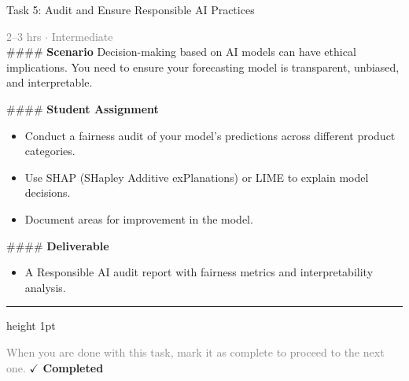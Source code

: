 \documentclass[10pt,a4paper]{article}
\begin{document}
\begin{taskbox}{Task 5: Audit and Ensure Responsible AI Practices}

    {\small \textcolor{gray}{2--3 hrs $\cdot$ Intermediate}}\\[12pt]

    \#\#\#\# \textbf{Scenario}  
Decision-making based on AI models can have ethical implications. You need to ensure your forecasting model is transparent, unbiased, and interpretable.

\#\#\#\# \textbf{Student Assignment}  
\begin{itemize}
    \item Conduct a fairness audit of your model’s predictions across different product categories.  
    \item Use SHAP (SHapley Additive exPlanations) or LIME to explain model decisions.  
    \item Document areas for improvement in the model.  
\end{itemize}

\#\#\#\# \textbf{Deliverable}  
\begin{itemize}
    \item A Responsible AI audit report with fairness metrics and interpretability analysis.\par
\end{itemize}

    \vspace{16pt}

    \textcolor{cardBorder}{\hrule height 1pt}\vspace{8pt}

    \small \textcolor{gray}{When you are done with this task, mark it as complete to proceed to the next one.} \hfill \textbf{\textcolor{brandDark}{$\checkmark$ Completed}}

\end{taskbox}
\end{document}
